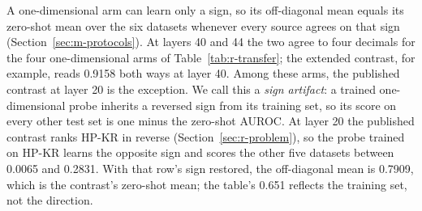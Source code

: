 A one-dimensional arm can learn only a sign, so its off-diagonal mean equals its zero-shot mean over the six datasets whenever every source agrees on that sign (Section~\ref{sec:m-protocols}). %
At layers 40 and 44 the two agree to four decimals for the four one-dimensional arms of Table~\ref{tab:r-transfer}; the extended contrast, for example, reads 0.9158 both ways at layer 40. %
Among these arms, the published contrast at layer 20 is the exception. %
We call this a \emph{sign artifact}: a trained one-dimensional probe inherits a reversed sign from its training set, so its score on every other test set is one minus the zero-shot AUROC. %
At layer 20 the published contrast ranks HP-KR in reverse (Section~\ref{sec:r-problem}), so the probe trained on HP-KR learns the opposite sign and scores the other five datasets between 0.0065 and 0.2831. %
With that row's sign restored, the off-diagonal mean is 0.7909, which is the contrast's zero-shot mean; the table's 0.651 reflects the training set, not the direction. %

